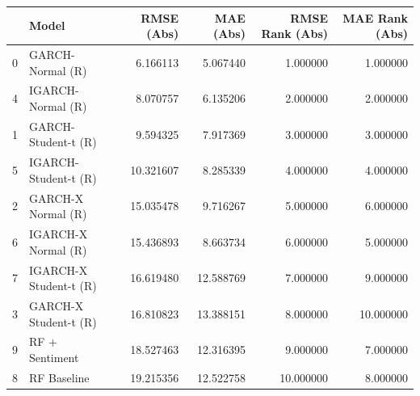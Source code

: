 \begin{table}[htbp]
\centering
\begin{tabular}{llrrrr}
\toprule
 & Model & RMSE (Abs) & MAE (Abs) & RMSE Rank (Abs) & MAE Rank (Abs) \\
\midrule
0 & GARCH-Normal (R) & 6.166113 & 5.067440 & 1.000000 & 1.000000 \\
4 & IGARCH-Normal (R) & 8.070757 & 6.135206 & 2.000000 & 2.000000 \\
1 & GARCH-Student-t (R) & 9.594325 & 7.917369 & 3.000000 & 3.000000 \\
5 & IGARCH-Student-t (R) & 10.321607 & 8.285339 & 4.000000 & 4.000000 \\
2 & GARCH-X Normal (R) & 15.035478 & 9.716267 & 5.000000 & 6.000000 \\
6 & IGARCH-X Normal (R) & 15.436893 & 8.663734 & 6.000000 & 5.000000 \\
7 & IGARCH-X Student-t (R) & 16.619480 & 12.588769 & 7.000000 & 9.000000 \\
3 & GARCH-X Student-t (R) & 16.810823 & 13.388151 & 8.000000 & 10.000000 \\
9 & RF + Sentiment & 18.527463 & 12.316395 & 9.000000 & 7.000000 \\
8 & RF Baseline & 19.215356 & 12.522758 & 10.000000 & 8.000000 \\
\bottomrule
\end{tabular}
\label{tab:robustness_absolute_returns}
\end{table}
